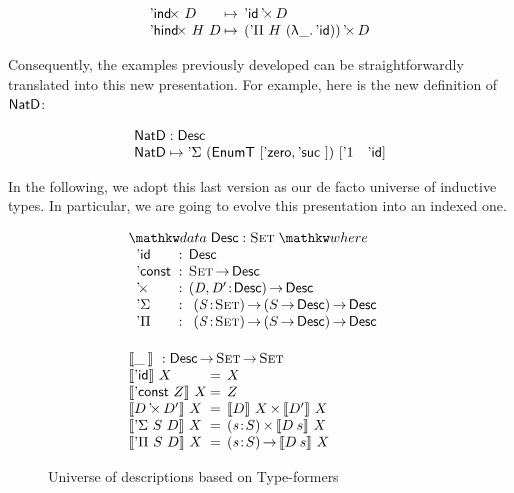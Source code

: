 \[\begin{array}{l@{\:\mapsto\:\:}l}
\DIndx{D}         & \DProd{\DId}{D}                      \\
\DHindx{H}{D}     & \DProd{(\DPi{H}{(\LAM{\_} \DId)})}{D}
\end{array}
\]

Consequently, the examples previously developed can be
straightforwardly translated into this new presentation. For example,
here is the new definition of $\NatD$:

\[\stk{
\NatD : \Desc \\
\NatD \mapsto \DSigma{(\EnumT{[ \NatZero, \NatSuc{} ]})}
                     {[ \DUnit \quad \DId ]}
}\]


In the following, we adopt this last version as our de
facto universe of inductive types. In particular, we are going to
evolve this presentation into an indexed one.


\begin{figure}

\[\stk{
\begin{array}{ll}
\stk{
\data \Desc : \Set \where                                      \\
\;\;\begin{array}{@{}l@{\::\:\:}l@{\quad}l}
    \DId            & \Desc                                    \\
    \DConst{}       & \Set \To \Desc                           \\
    \DProd{}{}      & \PI{\V{D}, \V{D'}}{\Desc} \Desc          \\
    \DSigma         & \PI{\V{S}}{\Set} \PIS{S \To \Desc} \Desc \\
    \DPi            & \PI{\V{S}}{\Set} \PIS{S \To \Desc} \Desc 
\end{array}
}
\vspace{0.2in}
\\
\stk{
\descop{\_\:}{} : \Desc \To \Set \To \Set \\
\begin{array}{@{}l@{\:=\:\:}ll}
\descop{\DId}{X}          &  X                                           \\
\descop{\DConst{Z}}{X}    &  Z                                           \\
\descop{\DProd{D}{D'}}{X} &  \TIMES{\descop{D}{X}}{\descop{D'}{X}}       \\
\descop{\DSigma{S}{D}}{X} &  \SIGMA{\V{s}}{S} \descop{D\: s}{X}          \\
\descop{\DPi{S}{D}}{X}    &  \PI{\V{s}}{S} \descop{D\: s}{X}            
\end{array}
}
\end{array}
}\]

\caption{Universe of descriptions based on Type-formers}
\label{fig:type-former-desc}

\end{figure}

